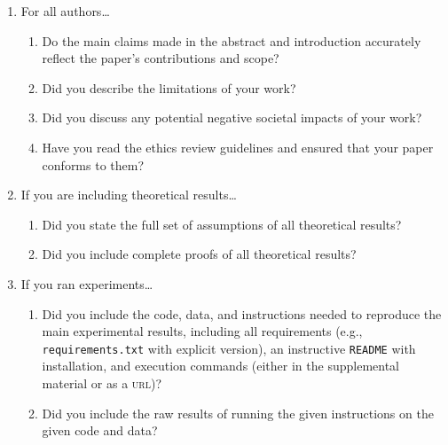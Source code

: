 \documentclass[11pt]{article}
\begin{document}
\begin{enumerate}
\item For all authors\dots
  \begin{enumerate}
  \item Do the main claims made in the abstract and introduction accurately
    reflect the paper's contributions and scope?
  \item Did you describe the limitations of your work?
  \item Did you discuss any potential negative societal impacts of your work?
  \item Have you read the ethics review guidelines and ensured that your paper
    conforms to them?
  \end{enumerate}
\item If you are including theoretical results\dots
  \begin{enumerate}
  \item Did you state the full set of assumptions of all theoretical results?
  \item Did you include complete proofs of all theoretical results?
  \end{enumerate}
\item If you ran experiments\dots
  \begin{enumerate}
  \item Did you include the code, data, and instructions needed to reproduce the
    main experimental results, including all requirements (e.g.,
    \texttt{requirements.txt} with explicit version), an instructive
    \texttt{README} with installation, and execution commands (either in the
    supplemental material or as a \textsc{url})?
  \item Did you include the raw results of running the given instructions on the
    given code and data?

\end{enumerate}
\end{enumerate}
\end{document}
